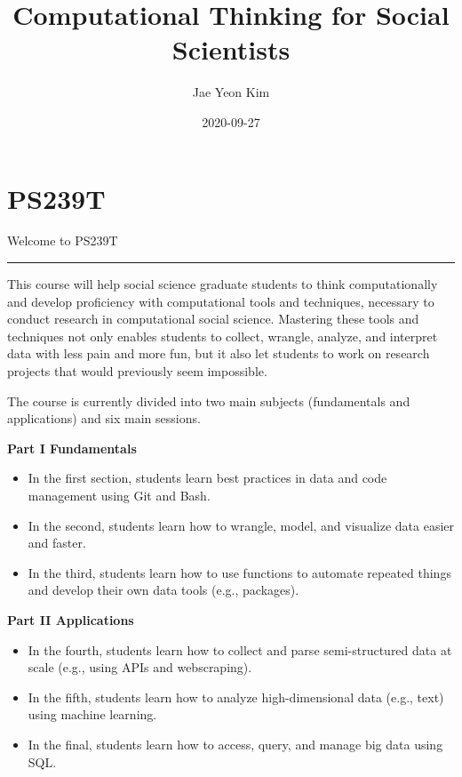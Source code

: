 \documentclass[
]{book}
\title{Computational Thinking for Social Scientists}
\author{Jae Yeon Kim}
\date{2020-09-27}
\begin{document}
\maketitle

{
\setcounter{tocdepth}{1}
\tableofcontents
}
\hypertarget{ps239t}{%
\chapter{PS239T}\label{ps239t}}

Welcome to PS239T

\begin{center}\rule{0.5\linewidth}{0.5pt}\end{center}

This course will help social science graduate students to think computationally and develop proficiency with computational tools and techniques, necessary to conduct research in computational social science. Mastering these tools and techniques not only enables students to collect, wrangle, analyze, and interpret data with less pain and more fun, but it also let students to work on research projects that would previously seem impossible.

The course is currently divided into two main subjects (fundamentals and applications) and six main sessions.

\textbf{Part I Fundamentals}

\begin{itemize}
\item
  In the first section, students learn best practices in data and code management using Git and Bash.
\item
  In the second, students learn how to wrangle, model, and visualize data easier and faster.
\item
  In the third, students learn how to use functions to automate repeated things and develop their own data tools (e.g., packages).
\end{itemize}

\textbf{Part II Applications}

\begin{itemize}
\item
  In the fourth, students learn how to collect and parse semi-structured data at scale (e.g., using APIs and webscraping).
\item
  In the fifth, students learn how to analyze high-dimensional data (e.g., text) using machine learning.
\item
  In the final, students learn how to access, query, and manage big data using SQL.
\end{itemize}
\end{document}
